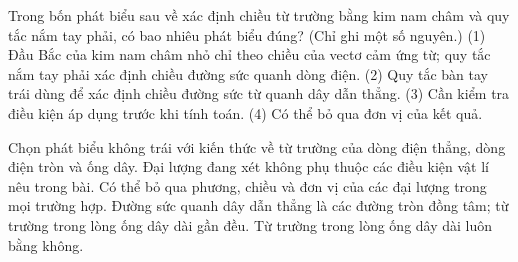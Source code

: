 \begin{ex}
Trong bốn phát biểu sau về xác định chiều từ trường bằng kim nam châm và quy tắc nắm tay phải, có bao nhiêu phát biểu đúng? (Chỉ ghi một số nguyên.) (1) Đầu Bắc của kim nam châm nhỏ chỉ theo chiều của vectơ cảm ứng từ; quy tắc nắm tay phải xác định chiều đường sức quanh dòng điện. (2) Quy tắc bàn tay trái dùng để xác định chiều đường sức từ quanh dây dẫn thẳng. (3) Cần kiểm tra điều kiện áp dụng trước khi tính toán. (4) Có thể bỏ qua đơn vị của kết quả.
\end{ex}

\begin{ex}
Chọn phát biểu không trái với kiến thức về từ trường của dòng điện thẳng, dòng điện tròn và ống dây.
\choice
{Đại lượng đang xét không phụ thuộc các điều kiện vật lí nêu trong bài.}
{Có thể bỏ qua phương, chiều và đơn vị của các đại lượng trong mọi trường hợp.}
{\True Đường sức quanh dây dẫn thẳng là các đường tròn đồng tâm; từ trường trong lòng ống dây dài gần đều.}
{Từ trường trong lòng ống dây dài luôn bằng không.}
\end{ex}

